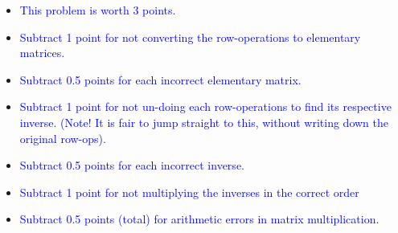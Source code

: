 \documentclass[10pt,twoside]{article}
\begin{document}
\begin{itemize}
\item\textcolor{blue}{This problem is worth 3 points.}
\item\textcolor{blue}{Subtract 1 point for not converting the row-operations to
elementary matrices.}
\item\textcolor{blue}{Subtract 0.5 points for each incorrect elementary
matrix.}
\item\textcolor{blue}{Subtract 1 point for not un-doing each row-operations to
find its respective inverse.  (Note!  It is fair to jump straight to this,
without writing down the original row-ops).}
\item\textcolor{blue}{Subtract 0.5 points for each incorrect inverse.}
\item\textcolor{blue}{Subtract 1 point for not multiplying the inverses in the
correct order}
\item\textcolor{blue}{Subtract 0.5 points (total) for arithmetic errors in
matrix multiplication.}
\end{itemize}
\end{document}
